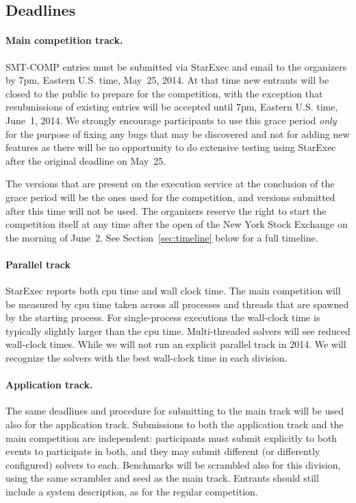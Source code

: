 \documentclass[12pt]{article}
\begin{document}
\subsection*{Deadlines} %

\paragraph{Main competition track.} %
SMT-COMP entries must be submitted via StarExec and email to the organizers by 7pm, Eastern U.S.
time, May~25, 2014.  At that time new entrants will be
closed to the public to prepare for the competition, with the
exception that resubmissions of existing entries will be accepted
until 7pm, Eastern U.S. time, June~1, 2014.  We strongly encourage
participants to use this grace period \emph{only} for the
purpose of fixing any bugs that may be discovered and not for adding
new features as there will be no opportunity to do extensive testing
using StarExec after the original deadline on May~25.

The versions that are present on the execution service at the conclusion of the
grace period will be the ones used for the competition, and versions
submitted after this time will not be used.  The organizers reserve
the right to start the competition itself at any time after the open
of the New York Stock Exchange on the morning of June~2.  See
Section~\ref{sec:timeline} below for a full timeline.

\paragraph{Parallel track}
StarExec reports both cpu time and wall clock time. The main competition will be measured by cpu time taken across all processes and threads that are spawned by the starting process. For single-process executions the wall-clock time is typically slightly larger than the cpu time. Multi-threaded solvers will see reduced wall-clock times. While we will not run an explicit parallel track in 2014. We will recognize the solvers with the best wall-clock time in each division.

\paragraph{Application track.} %
The same deadlines and procedure for submitting to the main track will be used
also for the application track. Submissions to both the application track and
the main competition are independent: participants must submit explicitly to
both events to participate in both, and they may submit different (or
differently configured) solvers to each.  Benchmarks will be scrambled also
for this division, using the same scrambler and seed as the main track.
Entrants should still include a system description, as for the regular
competition.
\end{document}
